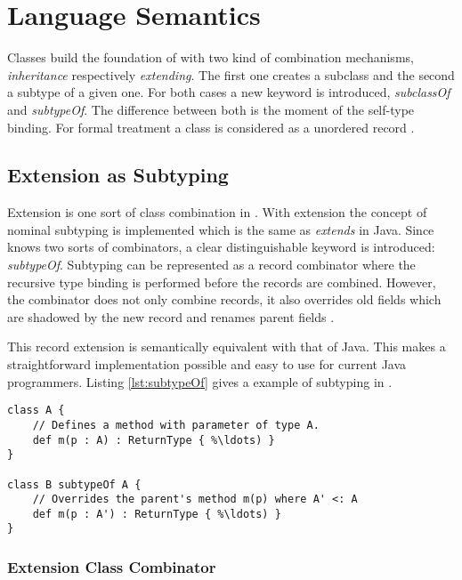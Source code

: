 \chapter{Language Semantics}
Classes build the foundation of \ooplss with two kind of combination mechanisms, 
\emph{inheritance} respectively \emph{extending}. The
first one creates a subclass and the second a subtype of a given
one. For both cases a new keyword is introduced, \emph{subclassOf}
and \emph{subtypeOf}. The difference between both is the moment of
the self-type binding. For formal treatment a class is considered as a
unordered record \cite{simons_theory_2002-1}.

\section{Extension as Subtyping}
Extension is one sort of class combination in \ooplss. With extension the concept
of nominal subtyping is implemented which is the same as \emph{extends} in Java.
Since \ooplss knows two sorts of combinators, a clear distinguishable keyword is
introduced: \emph{subtypeOf}. Subtyping can be represented as a record combinator
where the recursive type binding is performed before the records are combined.
However, the combinator does not only combine records, it also overrides old
fields which are shadowed by the new record and renames parent
fields \cite{simons_theory_2003-2}.

This record extension is semantically equivalent with that of Java. This
makes a straightforward implementation possible and easy to use for
current Java programmers. Listing \ref{lst:subtypeOf} gives a example
of subtyping in \ooplss.

\begin{lstlisting}[float,language=ooplss,caption=Subtyping in \ooplss,label=lst:subtypeOf]
class A {
	// Defines a method with parameter of type A.
	def m(p : A) : ReturnType { %\ldots) }
}

class B subtypeOf A {
	// Overrides the parent's method m(p) where A' <: A
	def m(p : A') : ReturnType { %\ldots) }
}
\end{lstlisting}


\subsection{Extension Class Combinator}

